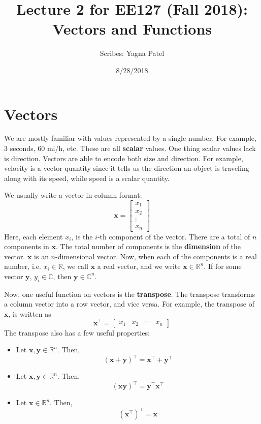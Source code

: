 \documentclass[12pt]{article}
\title{Lecture 2 for EE127 (Fall 2018): Vectors and Functions}
\author{Scribes: Yagna Patel}
\date{8/28/2018}
\begin{document}
\maketitle

\section{Vectors}
We are mostly familiar with values represented by a single number. For example, $3$ seconds, $60$ mi/h, etc. These are all \textbf{scalar} values. One thing scalar values lack is direction. Vectors are able to encode both size and direction. For example, velocity is a vector quantity since it tells us the direction an object is traveling along with its speed, while speed is a scalar quantity.

\noindent We usually write a vector in column format: $$\mathbf{x} = \begin{bmatrix}x_1 \\ x_2 \\ \vdots \\ x_n\end{bmatrix}$$ Here, each element $x_i$, is the $i$-th component of the vector. There are a total of $n$ components in $\mathbf{x}$. The total number of components is the \textbf{dimension} of the vector. $\mathbf{x}$ is an $n$-dimensional vector. Now, when each of the components is a real number, i.e. $x_i\in\mathbb{R}$, we call $\mathbf{x}$ a real vector, and we write $\mathbf{x}\in\mathbb{R}^n$. If for some vector $\mathbf{y}$, $y_i\in\mathbb{C}$, then $\mathbf{y}\in\mathbb{C}^n$.

\noindent Now, one useful function on vectors is the \textbf{transpose}. The transpose transforms a column vector into a row vector, and vice versa. For example, the transpose of $\mathbf{x}$, is written as $$\mathbf{x}^\top = \begin{bmatrix}x_1 & x_2 & \cdots  & x_n\end{bmatrix}$$ The transpose also has a few useful properties:
\begin{itemize}
\item Let $\mathbf{x},\mathbf{y}\in\mathbb{R}^n$. Then, $$(\mathbf{x}+\mathbf{y})^\top = \mathbf{x}^\top + \mathbf{y}^\top$$
\item Let $\mathbf{x},\mathbf{y}\in\mathbb{R}^n$. Then, $$(\mathbf{x}\mathbf{y})^\top = \mathbf{y}^\top\mathbf{x}^\top$$
\item Let $\mathbf{x}\in\mathbb{R}^n$. Then, $$\left(\mathbf{x}^\top\right)^\top = \mathbf{x}$$
\end{itemize} 
\end{document}
